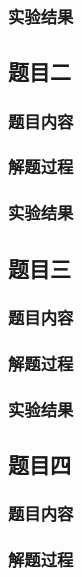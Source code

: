 \documentclass[11pt,a4paper]{ctexart}
\begin{document}
\subsubsection{实验结果}
\mbox{}

\subsection{题目二}
\subsubsection{题目内容}
\mbox{}

\subsubsection{解题过程}
\mbox{}

\subsubsection{实验结果}
\mbox{}

\subsection{题目三}
\subsubsection{题目内容}
\mbox{}

\subsubsection{解题过程}
\mbox{}

\subsubsection{实验结果}
\mbox{}

\subsection{题目四}
\subsubsection{题目内容}
\mbox{}

\subsubsection{解题过程}
\mbox{}
\end{document}
